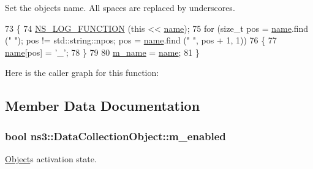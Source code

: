 Set the object\textquotesingle{}s name. All spaces are replaced by underscores. 


\begin{DoxyCode}
73 \{
74   \hyperlink{log-macros-disabled_8h_a90b90d5bad1f39cb1b64923ea94c0761}{NS\_LOG\_FUNCTION} (\textcolor{keyword}{this} << \hyperlink{generate__test__data__lte__spectrum__model_8m_ab74e6bf80237ddc4109968cedc58c151}{name});
75   \textcolor{keywordflow}{for} (\textcolor{keywordtype}{size\_t} pos = \hyperlink{generate__test__data__lte__spectrum__model_8m_ab74e6bf80237ddc4109968cedc58c151}{name}.find (\textcolor{stringliteral}{" "}); pos != std::string::npos; pos = \hyperlink{generate__test__data__lte__spectrum__model_8m_ab74e6bf80237ddc4109968cedc58c151}{name}.find (\textcolor{stringliteral}{" "}, pos + 1, 1))
76     \{
77       \hyperlink{generate__test__data__lte__spectrum__model_8m_ab74e6bf80237ddc4109968cedc58c151}{name}[pos] = \textcolor{charliteral}{'\_'};
78     \}
79 
80   \hyperlink{classns3_1_1DataCollectionObject_a06696e9fa95aeeeb6bd84b35ef8e6f40}{m\_name} = \hyperlink{generate__test__data__lte__spectrum__model_8m_ab74e6bf80237ddc4109968cedc58c151}{name};
81 \}
\end{DoxyCode}


Here is the caller graph for this function\+:




\subsection{Member Data Documentation}
\subsubsection[{\texorpdfstring{m\+\_\+enabled}{m_enabled}}]{\setlength{\rightskip}{0pt plus 5cm}bool ns3\+::\+Data\+Collection\+Object\+::m\+\_\+enabled\hspace{0.3cm}{\ttfamily [protected]}}\hypertarget{classns3_1_1DataCollectionObject_a3e8b0578f03044b1db4811ecff2be7ea}{}\label{classns3_1_1DataCollectionObject_a3e8b0578f03044b1db4811ecff2be7ea}


\hyperlink{classns3_1_1Object}{Object}\textquotesingle{}s activation state. 

